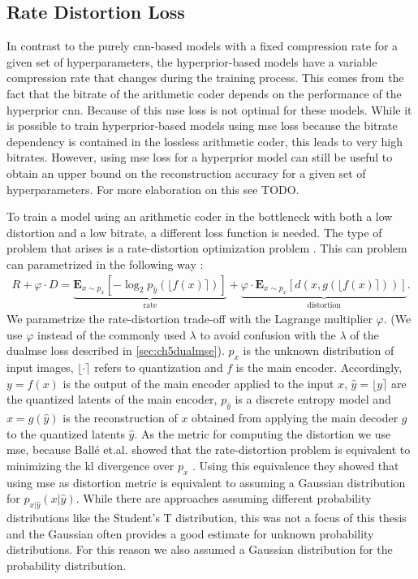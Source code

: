 \subsection{Rate Distortion Loss}
In contrast to the purely \ac{cnn}-based models with a fixed compression rate for a given set of hyperparameters, the hyperprior-based models have a variable compression rate that changes during the training process. This comes from the fact that the bitrate of the arithmetic coder depends on the performance of the hyperprior \ac{cnn}. Because of this \ac{mse} loss is not optimal for these models. While it is possible to train hyperprior-based models using \ac{mse} loss because the bitrate dependency is contained in the lossless arithmetic coder, this leads to very high bitrates. However, using \ac{mse} loss for a hyperprior model can still be useful to obtain an upper bound on the reconstruction accuracy for a given set of hyperparameters. For more elaboration on this see TODO.

To train a model using an arithmetic coder in the bottleneck with both a low distortion and a low bitrate, a different loss function is needed. The type of problem that arises is a rate-distortion optimization problem \citep{balle_variational_2018}. This can problem can parametrized in the following way \citep{minnen_joint_2018}:
\begin{align}
R + \varphi \cdot D = \underbrace{\mathbf{E}_{x\sim p_x} [ -\log_2 p_{\hat{y}}(\lfloor f(x)\rceil)]}_\text{rate}+ \underbrace{\varphi \cdot\mathbf{E}_{x\sim p_x} [d(x,g(\lfloor f(x)\rceil))]}_\text{distortion}.
\end{align}
We parametrize the rate-distortion trade-off with the Lagrange multiplier $\varphi$. (We use $\varphi$ instead of the commonly used $\lambda$ to avoid confusion with the $\lambda$ of the \ac{dualmse} loss described in \autoref{sec:ch5dualmse}). $p_x$ is the unknown distribution of input images, $\lfloor\cdot\rceil$ refers to quantization and $f$ is the main encoder. Accordingly, $y=f(x)$ is the output of the main encoder applied to the input $x$, $\hat{y} = \lfloor y\rceil$ are the quantized latents of the main encoder, $p_{\hat{y}}$ is a discrete entropy model and $\hat{x}=g(\hat{y})$ is the reconstruction of $x$ obtained from applying the main decoder $g$ to the quantized latents $\hat{y}$. As the metric for computing the distortion we use \ac{mse}, because Ballé et.al. showed that the rate-distortion problem is equivalent to minimizing the \ac{kl} divergence over $p_x$ \citep{balle_variational_2018}. Using this equivalence they showed that using \ac{mse} as distortion metric is equivalent to assuming a Gaussian distribution for $p_{x|\hat{y}}(x|\hat{y})$. While there are approaches assuming different probability distributions like the Student's T distribution, this was not a focus of this thesis and the Gaussian often provides a good estimate for unknown probability distributions. For this reason we also assumed a Gaussian distribution for the probability distribution.

